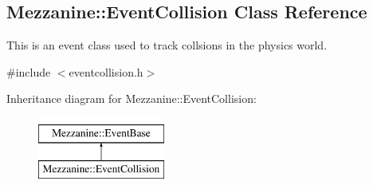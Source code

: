 \hypertarget{classMezzanine_1_1EventCollision}{
\subsection{Mezzanine::EventCollision Class Reference}
\label{classMezzanine_1_1EventCollision}
}


This is an event class used to track collsions in the physics world.  




{\ttfamily \#include $<$eventcollision.h$>$}

Inheritance diagram for Mezzanine::EventCollision:\begin{figure}[H]
\begin{center}
\leavevmode
\includegraphics[height=2.000000cm]{classMezzanine_1_1EventCollision}
\end{center}
\end{figure}
